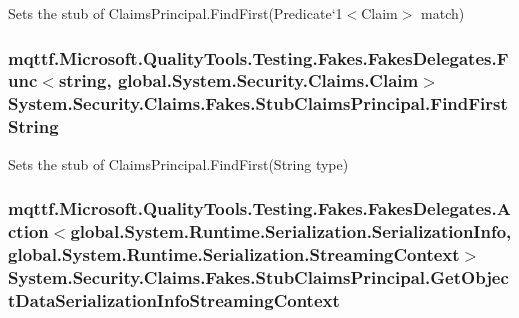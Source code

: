 Sets the stub of Claims\-Principal.\-Find\-First(Predicate`1$<$Claim$>$ match)

\hypertarget{class_system_1_1_security_1_1_claims_1_1_fakes_1_1_stub_claims_principal_a2007e48975afaa8654dfa264495a5cde}{
\subsubsection[{Find\-First\-String}]{\setlength{\rightskip}{0pt plus 5cm}mqttf.\-Microsoft.\-Quality\-Tools.\-Testing.\-Fakes.\-Fakes\-Delegates.\-Func$<$string, global.\-System.\-Security.\-Claims.\-Claim$>$ System.\-Security.\-Claims.\-Fakes.\-Stub\-Claims\-Principal.\-Find\-First\-String}}\label{class_system_1_1_security_1_1_claims_1_1_fakes_1_1_stub_claims_principal_a2007e48975afaa8654dfa264495a5cde}


Sets the stub of Claims\-Principal.\-Find\-First(\-String type)

\hypertarget{class_system_1_1_security_1_1_claims_1_1_fakes_1_1_stub_claims_principal_ada7636c042836ac37f097d275258de71}{
\subsubsection[{Get\-Object\-Data\-Serialization\-Info\-Streaming\-Context}]{\setlength{\rightskip}{0pt plus 5cm}mqttf.\-Microsoft.\-Quality\-Tools.\-Testing.\-Fakes.\-Fakes\-Delegates.\-Action$<$global.\-System.\-Runtime.\-Serialization.\-Serialization\-Info, global.\-System.\-Runtime.\-Serialization.\-Streaming\-Context$>$ System.\-Security.\-Claims.\-Fakes.\-Stub\-Claims\-Principal.\-Get\-Object\-Data\-Serialization\-Info\-Streaming\-Context}}\label{class_system_1_1_security_1_1_claims_1_1_fakes_1_1_stub_claims_principal_ada7636c042836ac37f097d275258de71}


